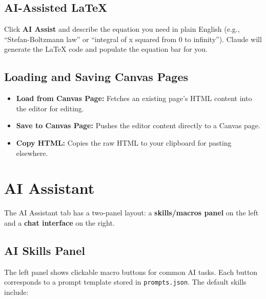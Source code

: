 \documentclass[12pt,letterpaper]{article}
\begin{document}
\subsection{AI-Assisted \LaTeX{}}

Click \textbf{AI Assist} and describe the equation you need in plain English (e.g., ``Stefan-Boltzmann law'' or ``integral of x squared from 0 to infinity''). Claude will generate the \LaTeX{} code and populate the equation bar for you.

\subsection{Loading and Saving Canvas Pages}

\begin{itemize}[leftmargin=*]
    \item \textbf{Load from Canvas Page:} Fetches an existing page's HTML content into the editor for editing.
    \item \textbf{Save to Canvas Page:} Pushes the editor content directly to a Canvas page.
    \item \textbf{Copy HTML:} Copies the raw HTML to your clipboard for pasting elsewhere.
\end{itemize}


\section{AI Assistant}

The AI Assistant tab has a two-panel layout: a \textbf{skills/macros panel} on the left and a \textbf{chat interface} on the right.

\subsection{AI Skills Panel}

The left panel shows clickable macro buttons for common AI tasks. Each button corresponds to a prompt template stored in \texttt{prompts.json}. The default skills include:
\end{document}
